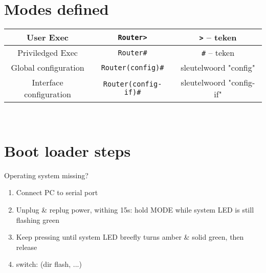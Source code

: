 \documentclass[10pt, a4paper]{article}
\begin{document}
	\section{Modes defined}
	\begin{tabular}{|c|c|c|}
		\hline \rule[-1ex]{0pt}{4ex} User Exec & \texttt{Router>} & \texttt{>} -- teken \\ 
		\hline \rule[-1ex]{0pt}{4ex} Priviledged Exec & \texttt{Router\#} & \texttt{\#} -- teken \\ 
		\hline \rule[-1ex]{0pt}{4ex} Global configuration & \texttt{Router(config)\#} & sleutelwoord "config" \\ 
		\hline \rule[-1ex]{0pt}{4ex} Interface configuration & \texttt{Router(config-if)\#} & sleutelwoord "config-if" \\ 
		\hline 
	\end{tabular} \\
	
	\section{Boot loader steps}
	Operating system missing?
	\begin{enumerate}
		\item Connect PC to serial port
		\item Unplug \& replug power, withing 15s: hold MODE while system LED is still flashing green
		\item Keep pressing until system LED breefly turns amber \& solid green, then release
		\item switch: (dir flash, ...)
	\end{enumerate}	
	
\end{document}
